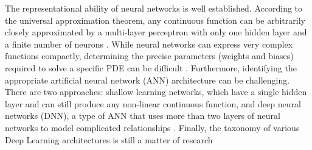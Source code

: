 \documentclass[pdflatex,sn-basic]{sn-jnl}%
\theoremstyle{thmstyleone}%
\theoremstyle{thmstyletwo}%
\theoremstyle{thmstylethree}%
\begin{document}
The representational ability of neural networks is well established.
%
According to the universal approximation theorem, any continuous function can be arbitrarily closely approximated by a multi-layer perceptron with only one hidden layer and a finite number of neurons \citep{Hor1989_MultilayerFeedforwardNetworks_StiHSW, Cyb1989_ApproximationSuperpositionsSigmoidal_Cyb, Yar2017_ErrorBoundsApproximations_Yar, Ber2019_SurveyDeepLearning_BucBBCC}.
%
While neural networks can express very complex functions compactly, determining the precise parameters (weights and biases) required to solve a specific PDE can be difficult \citep{Wah2021_PinneikEikonalSolution_HagWHA}.
%
%
Furthermore, identifying the appropriate artificial neural network (ANN) architecture can be challenging.
%
There are two approaches: shallow learning networks, which have a single hidden layer and can still produce any non-linear continuous function, and deep neural networks (DNN), a type of ANN that uses more than two layers of neural networks to model complicated relationships
\citep{Ald2020_DeepLearningApproaches_DerADE}.
Finally, the taxonomy of various Deep Learning architectures is still a matter of research  \citep{Muh2021_DeepLearningApplication_AseMAC, Ald2020_DeepLearningApproaches_DerADE, Sen2020_ReviewDeepLearning_BasSBS}
\end{document}
